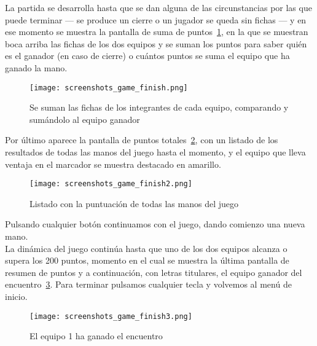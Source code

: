La partida se desarrolla hasta que se dan alguna de las circunstancias por las que puede terminar --- se produce un cierre o 
un jugador se queda sin fichas --- y en ese momento se muestra la pantalla de suma de puntos~\ref{fig:screenshotsgamefinish},
en la que se muestran boca arriba las fichas de los dos equipos y se suman los puntos para saber quién es el ganador (en caso
de cierre) o cuántos puntos se suma el equipo que ha ganado la mano.

\begin{figure}[hp]
  \begin{center}
    \texttt{[image: screenshots\_game\_finish.png]}
  \end{center}
  \caption{Se suman las fichas de los integrantes de cada equipo, comparando y sumándolo al equipo ganador}
  \label{fig:screenshotsgamefinish}
\end{figure}

Por último aparece la pantalla de puntos totales~\ref{fig:screenshotsgamefinish2}, con un listado de los resultados de
todas las manos del juego hasta el momento, y el equipo que lleva ventaja en el marcador se muestra destacado en amarillo. \\

\begin{figure}[hp]
  \begin{center}
    \texttt{[image: screenshots\_game\_finish2.png]}
  \end{center}
  \caption{Listado con la puntuación de todas las manos del juego}
  \label{fig:screenshotsgamefinish2}
\end{figure}

Pulsando cualquier botón continuamos con el juego, dando comienzo una nueva mano. \\

La dinámica del juego continúa hasta que uno de los dos equipos alcanza o supera los 200 puntos, momento en el cual se
muestra la última pantalla de resumen de puntos y a continuación, con letras titulares, el equipo ganador del
encuentro~\ref{fig:screenshotsgamefinish3}. Para terminar pulsamos cualquier tecla y volvemos al menú de inicio.

\begin{figure}[hp]
  \begin{center}
    \texttt{[image: screenshots\_game\_finish3.png]}
  \end{center}
  \caption{El equipo 1 ha ganado el encuentro}
  \label{fig:screenshotsgamefinish3}
\end{figure}


